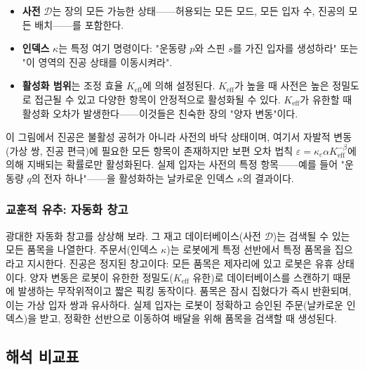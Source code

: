 \documentclass[12pt,a4paper]{article}
\begin{document}
	\begin{itemize}[leftmargin=*]
		\item \textbf{사전} $\mathcal{D}$는 장의 모든 가능한 상태——허용되는 모든 모드, 모든 입자 수, 진공의 모든 배치——를 포함한다.
		\item \textbf{인덱스} $\kappa$는 특정 여기 명령이다: "운동량 $p$와 스핀 $s$를 가진 입자를 생성하라" 또는 "이 영역의 진공 상태를 이동시켜라".
		\item \textbf{활성화 범위}는 조정 효율 $K_{\mathrm{eff}}$에 의해 설정된다. $K_{\mathrm{eff}}$가 높을 때 사전은 높은 정밀도로 접근될 수 있고 다양한 항목이 안정적으로 활성화될 수 있다. $K_{\mathrm{eff}}$가 유한할 때 활성화 오차가 발생한다——이것들은 친숙한 장의 "양자 변동"이다.
	\end{itemize}
	
	이 그림에서 진공은 불활성 공허가 아니라 사전의 바닥 상태이며, 여기서 자발적 변동(가상 쌍, 진공 편극)에 필요한 모든 항목이 존재하지만 보편 오차 법칙 $\varepsilon = \kappa_c \alpha K_{\mathrm{eff}}^{-\beta}$에 의해 지배되는 확률로만 활성화된다. 실제 입자는 사전의 특정 항목——예를 들어 "운동량 $q$의 전자 하나"——을 활성화하는 날카로운 인덱스 $\kappa$의 결과이다.
	
	\subsubsection{교훈적 유추: 자동화 창고}
	
	광대한 자동화 창고를 상상해 보라. 그 재고 데이터베이스(사전 $\mathcal{D}$)는 검색될 수 있는 모든 품목을 나열한다. 주문서(인덱스 $\kappa$)는 로봇에게 특정 선반에서 특정 품목을 집으라고 지시한다. 진공은 정지된 창고이다: 모든 품목은 제자리에 있고 로봇은 유휴 상태이다. 양자 변동은 로봇이 유한한 정밀도($K_{\mathrm{eff}}$ 유한)로 데이터베이스를 스캔하기 때문에 발생하는 무작위적이고 짧은 픽킹 동작이다. 품목은 잠시 집혔다가 즉시 반환되며, 이는 가상 입자 쌍과 유사하다. 실제 입자는 로봇이 정확하고 승인된 주문(날카로운 인덱스)을 받고, 정확한 선반으로 이동하여 배달을 위해 품목을 검색할 때 생성된다.
	
	\medskip
	
	\subsection{해석 비교표}
	
\end{document}
